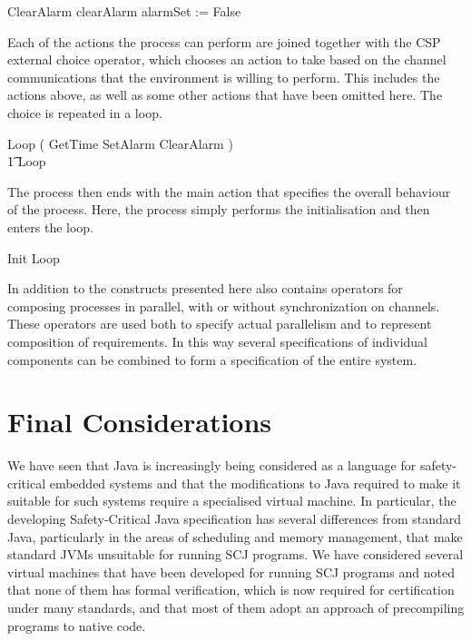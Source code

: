 \documentclass[a4paper,10pt]{report}
\begin{document}
%
\begin{circusaction}
  ClearAlarm \circdef clearAlarm \then alarmSet := False
\end{circusaction}
%
Each of the actions the process can perform are joined together with the CSP
external choice operator, which chooses an action to take based on the channel
communications that the environment is willing to perform. This includes the
actions above, as well as some other actions that have been omitted here. The
choice is repeated in a loop.
%
\begin{circusaction}
  Loop \circdef \left( GetTime \extchoice SetAlarm \extchoice ClearAlarm
    \extchoice \cdots \right) \\
  \t1 \circseq Loop
\end{circusaction}
%
The \Circus{} process then ends with the main action that specifies the overall
behaviour of the process. Here, the process simply performs the initialisation
and then enters the loop.
%
\begin{circusaction}
  \circspot Init \circseq Loop
\end{circusaction}
\begin{circus}
  \circend
\end{circus}

In addition to the constructs presented here \Circus{} also contains operators
for composing processes in parallel, with or without synchronization on
channels.  These operators are used both to specify actual parallelism and to
represent composition of requirements.  In this way several \Circus{}
specifications of individual components can be combined to form a specification
of the entire system.

\section{Final Considerations}
\label{final-considerations-section}


We have seen that Java is increasingly being considered as a language for
safety-critical embedded systems and that the modifications to Java required to
make it suitable for such systems require a specialised virtual machine.  In
particular, the developing Safety-Critical Java specification has several
differences from standard Java, particularly in the areas of scheduling and
memory management, that make standard JVMs unsuitable for running SCJ programs.
We have considered several virtual machines that have been developed for running
SCJ programs and noted that none of them has formal verification, which is now
required for certification under many standards, and that most of them adopt an
approach of precompiling programs to native code.
\end{document}
